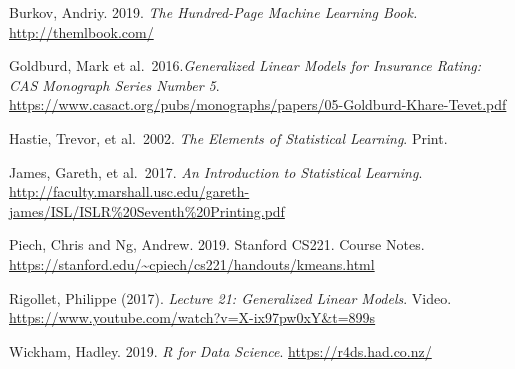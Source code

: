 \documentclass[openany]{book}
\begin{document}
Burkov, Andriy. 2019. \emph{The Hundred-Page Machine Learning Book.} \url{http://themlbook.com/}

Goldburd, Mark et al.~2016.\emph{Generalized Linear Models for Insurance Rating: CAS Monograph Series Number 5}. \url{https://www.casact.org/pubs/monographs/papers/05-Goldburd-Khare-Tevet.pdf}

Hastie, Trevor, et al.~2002. \emph{The Elements of Statistical Learning}. Print.

James, Gareth, et al.~2017. \emph{An Introduction to Statistical Learning}.
\url{http://faculty.marshall.usc.edu/gareth-james/ISL/ISLR\%20Seventh\%20Printing.pdf}

Piech, Chris and Ng, Andrew. 2019. Stanford CS221. Course Notes. \url{https://stanford.edu/~cpiech/cs221/handouts/kmeans.html}

Rigollet, Philippe (2017). \emph{Lecture 21: Generalized Linear Models}. Video. \url{https://www.youtube.com/watch?v=X-ix97pw0xY\&t=899s}

Wickham, Hadley. 2019. \emph{R for Data Science}. \url{https://r4ds.had.co.nz/}


\end{document}
